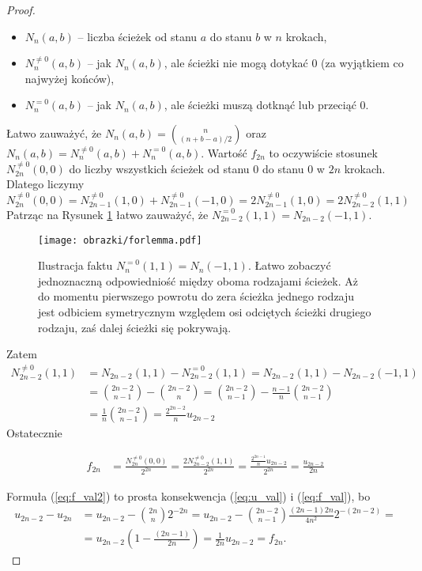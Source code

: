 \documentclass[a4paper,11pt,oneside]{book}
\theoremstyle{definition}
\begin{document}
\begin{proof}
\begin{itemize}
  \setlength\itemsep{1pt}
  \item $N_n(a,b)$ -- liczba ścieżek od stanu $a$ do stanu $b$ w $n$ krokach,
  \item $N_n^{\neq 0}(a,b)$ -- jak $N_n(a,b)$, ale ścieżki nie mogą dotykać 0 (za wyjątkiem co najwyżej końców),
  \item $N_n^{=0}(a,b)$ -- jak $N_n(a,b)$, ale ścieżki muszą dotknąć lub przeciąć 0.
\end{itemize}
Łatwo zauważyć, że $N_n(a,b) = \binom{n}{(n+b-a)/2}$ oraz $N_n(a,b) = N_n^{\neq 0}(a,b) + N_n^{= 0}(a,b)$. Wartość $f_{2n}$ to oczywiście stosunek $N_{2n}^{\neq 0}(0,0)$ do liczby wszystkich ścieżek od stanu 0 do stanu 0 w $2n$ krokach. Dlatego liczymy
\[ N_{2n}^{\neq 0}(0,0) = N_{2n-1}^{\neq 0}(1,0) + N_{2n-1}^{\neq 0}(-1,0) = 2N_{2n-1}^{\neq 0}(1,0)= 2N_{2n-2}^{\neq 0}(1,1) \]
Patrząc na Rysunek \ref{fig:forlemma} łatwo zauważyć, że $N_{2n-2}^{=0}(1,1) = N_{2n-2}(-1,1)$. 
\begin{figure}[h]
 \centering
 \texttt{[image: obrazki/forlemma.pdf]}
 \caption{Ilustracja faktu $N_n^{=0}(1,1) = N_n(-1,1)$. Łatwo zobaczyć jednoznaczną odpowiedniość między oboma rodzajami ścieżek. Aż do momentu pierwszego powrotu do zera ścieżka jednego rodzaju jest odbiciem symetrycznym względem osi odciętych ścieżki drugiego rodzaju, zaś dalej ścieżki się pokrywają.}
 \label{fig:forlemma}
\end{figure}
Zatem
\begin{equation*}
 \begin{split}
   N_{2n-2}^{\neq 0}(1,1)
   &= N_{2n-2}(1,1) - N_{2n-2}^{=0}(1,1) =  N_{2n-2}(1,1) - N_{2n-2}(-1,1) \\
   &= \binom{2n-2}{n-1} - \binom{2n-2}{n} = \binom{2n-2}{n-1} - \frac{n-1}{n}\binom{2n-2}{n-1} \\
   &= \frac{1}{n} \binom{2n-2}{n-1} = \frac{2^{2n-2}}{n} u_{2n-2}
 \end{split}
\end{equation*}
Ostatecznie

\begin{equation*}
 \begin{split}
   f_{2n} &= \frac{N_{2n}^{\neq 0}(0,0)}{2^{2n}} = \frac{2N_{2n-2}^{\neq 0}(1,1)}{2^{2n}} = \frac{\frac{2^{2n-1}}{n} u_{2n-2}}{2^{2n}} = \frac{u_{2n-2}}{2n}
 \end{split}
\end{equation*}

 Formuła (\ref{eq:f_val2}) to prosta konsekwencja (\ref{eq:u_val}) i (\ref{eq:f_val}), bo
 \begin{equation*}
 \begin{split}
    u_{2n-2} - u_{2n} &= u_{2n-2} - \binom{2n}{n}2^{-2n} =  u_{2n-2} - \binom{2n-2}{n-1} \frac{(2n-1)2n}{4n^2}2^{-(2n-2)} = \\
    &= u_{2n-2}\left(1 - \frac{(2n-1)}{2n} \right) = \frac{1}{2n} u_{2n-2} =  f_{2n}.
 \end{split}
 \end{equation*}
\end{proof}
\end{document}
